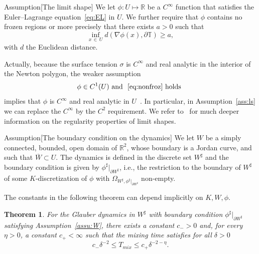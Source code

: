\documentclass[10pt]{amsart}
\newtheorem{theo}{Theorem}[section]
\theoremstyle{definition}\newtheorem{defi}[theo]{Definition}\newtheorem{rema}[theo]{Remark}\newtheorem{exam}[theo]{Example}\newtheorem{exem}[theo]{Example}\newtheorem{nota}[theo]{Notation}
\newcommand{\R}{\mathbb{R}}
\newcommand{\bbT}{\mathbb{T}}
\renewcommand{\d}{{\sharp }}
\begin{document}
\begin{enonce}
{Assumption}[The limit shape]\label{ass:ls}
We let $\phi:U\mapsto \R$ be a $C^\infty$ function that satisfies the Euler--Lagrange equation~\eqref{eq:EL} in $U$. We further require that $\phi$ contains no frozen regions or more precisely that there exists $a>0$ such that
\begin{equation}\label{eq:nonfroz}
\inf_{x\,\in\,U}d(\nabla\phi(x),\partial\bbT)\ge a,
\end{equation}
with $d$ the Euclidean distance.
\end{enonce}

Actually, because the surface tension $\sigma$ is $C^\infty$ and real analytic in the interior of the Newton polygon, the weaker assumption
\begin{equation}\label{eq:weaker}
\phi\in C^1(U) \text{ and }~\eqref{eq:nonfroz} \text{ holds }
\end{equation}
implies that $\phi$ is $C^\infty$ and real analytic in $U$~\cite[Sec.~VI.3]{Giaquinta}. In particular, in Assumption~\ref{ass:ls} we can replace the $C^\infty$ by the $C^2$ requirement. We refer to~\cite{Duse} for much deeper information on the regularity properties of limit shapes.


\begin{enonce}{Assumption}[The boundary condition on the dynamics]\label{assu:W}
We let $W$ be a simply connected, bounded, open domain of $\R^2$, whose boundary is a Jordan curve, and such that $\overline W\subset U$. The dynamics is defined in the discrete set $W^\d$ and the boundary condition is given by $\phi^\d|_{\partial W^\d}$, i.e., the restriction to the boundary of $W^\d$ of some $K$-discretization of $\phi$ with $\Omega_{W^\d,\phi^\d|_{\partial W^\d}}$ non-empty.
\end{enonce}

The constants in the following theorem can depend implicitly on $K,W,\phi$.

\begin{theo}\label{th:main}
For the Glauber dynamics in $W^\d$ with boundary condition $\phi^\d|_{\partial W^\d}$ satisfying Assumption~\ref{assu:W}, there exists a constant $c_->0$ and, for every $\eta>0$, a constant $c_+<\infty$ such that the mixing time satisfies for all $\delta>0$
\begin{equation}\label{eq:main}
c_- \delta^{-2}\le T_{mix}\le c_+\delta^{-2-\eta}.
\end{equation}
\end{theo}
\end{document}
